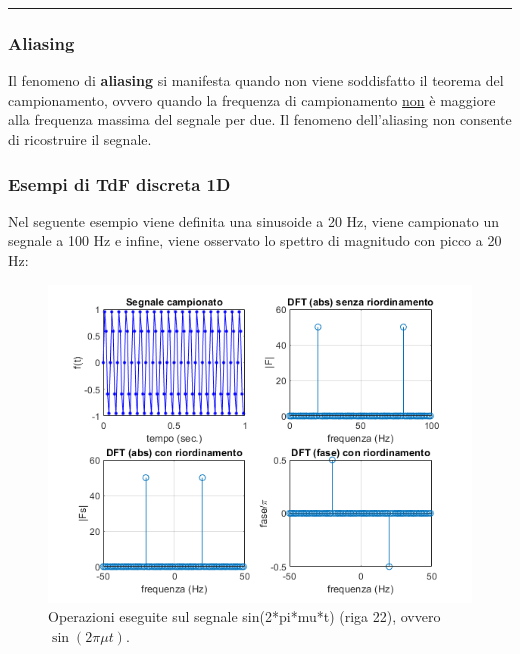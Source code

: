 \documentclass[a4paper]{article}
\newcommand{\longline}{\noindent\rule{\textwidth}{0.4pt}}
\begin{document}
	\longline
	
	\subsubsection{Aliasing}
	
	Il fenomeno di \textbf{aliasing} si manifesta quando non viene soddisfatto il teorema del campionamento, ovvero quando la frequenza di campionamento \underline{non} è maggiore alla frequenza massima del segnale per due. Il fenomeno dell'aliasing non consente di ricostruire il segnale.
	
	\subsubsection{Esempi di TdF discreta 1D}
	
	Nel seguente esempio viene definita una sinusoide a 20 Hz, viene campionato un segnale a 100 Hz e infine, viene osservato lo spettro di magnitudo con picco a 20 Hz:
	
	
	\noindent
	\begin{figure}[!htp]
		\centering
		\includegraphics[width=\textwidth]{img/lab/TdF-3.png}
		\caption{Operazioni eseguite sul segnale \textsf{sin(2*pi*mu*t)} (riga 22), ovvero $\sin\left(2 \pi \mu t\right)$.}
	\end{figure}\newpage
	
\end{document}
